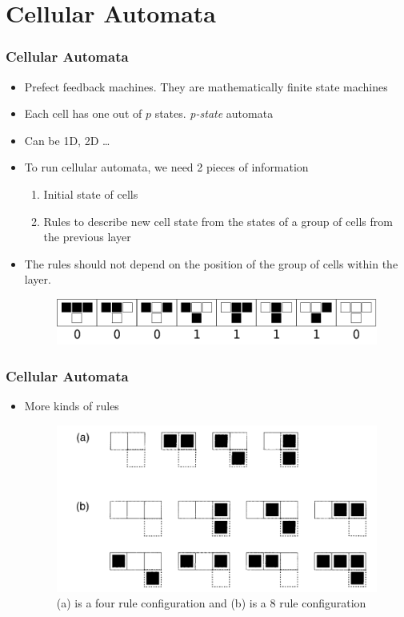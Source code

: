 \documentclass{beamer}
\begin{document}
\section{Cellular Automata}

\begin{frame}
    \frametitle{Cellular Automata}
    \begin{itemize}
        \item
        Prefect feedback machines. They are mathematically finite state machines
        \item
        Each cell has one out of $p$ states. \textit{p-state} automata
        \item
        Can be 1D, 2D \dots
        \item
        To run cellular automata, we need 2 pieces of information 
        \begin{enumerate}
            \item Initial state of cells 
            \item Rules to describe new cell state from the states of a group of cells from the previous layer 
        \end{enumerate}
        \item The rules should not depend on the position of the group of cells within the layer.
        \begin{figure}
            \includegraphics[scale = 0.5]{fig1.png} 
        \end{figure}
    \end{itemize}
\end{frame}

\begin{frame}
    \frametitle{Cellular Automata}
    \begin{itemize}
        \item More kinds of rules
        \begin{figure}[H]
            \includegraphics[scale = 0.37]{fig2}
            \caption{(a) is a four rule configuration and (b) is a 8 rule configuration}
        \end{figure}
    \end{itemize}
\end{frame}
\end{document}
